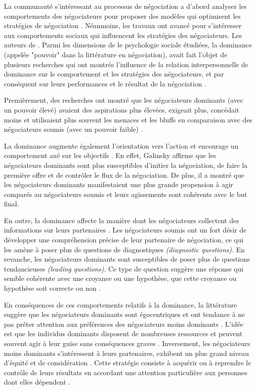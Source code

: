 	La communauté s'intéressant au processus de négociation a d'abord analyser les comportements des négociateurs pour proposer des modèles qui optimisent les stratégies de négociation \cite{thompson2010negotiation}.
	Néanmoins, les travaux ont avancé pour s'intéresser aux comportements sociaux qui influencent les stratégies des négociateurs. Les auteurs de \cite{thompson2010negotiation}. Parmi les dimensions de le psychologie sociale étudiées, la dominance  (appelée "pouvoir" dans la littérature en négociation), avait fait l'objet de plusieurs recherches qui ont montrés l'influence  de la relation interpersonnelle de dominance sur le comportement et les stratégies des négociateurs, et par conséquent sur leurs performances et le résultat de la négociation \cite{de1995impact,van2006power}.
	
	Premièrement, des recherches ont montré que les négociateurs dominants (avec un pouvoir élevé) avaient des aspirations plus élevées, exigeait plus, concédait moins et utilisaient plus souvent les menaces et les bluffs en comparaison avec des négociateurs soumis (avec un pouvoir faible) \cite{de1995impact}.
	
	
	 La dominance augmente également l'orientation vers l'action et encourage un comportement axé sur les objectifs \cite{van2006power}. En effet, Galinsky \cite{galinsky2003power} affirme que les négociateurs dominants sont plus susceptibles d'initier la négociation, de faire la première offre et de contrôler le flux de la négociation.  De plus, il a montré que les négociateurs dominants manifestaient une plus grande propension à agir comparés au négociateurs soumis et leurs agissements sont cohérents avec le but final.
	 
	 
	 En outre, la dominance affecte la manière dont les négociateurs collectent des informations sur leurs partenaires \cite{de2004influence}. Les négociateurs soumis ont un fort désir de développer une compréhension précise de leur partenaire de négociation, ce qui les amène à poser plus de questions  de diagnostiques \emph {(diagnostic questions)}.
	 En revanche, les négociateurs dominants sont susceptibles de poser plus de questions tendancieuses \emph {(leading questions)}. Ce type de question suggère une réponse  qui semble cohérente avec une croyance ou une hypothèse, que cette croyance ou hypothèse soit correcte ou non \cite{galinsky2003power}.
	
	En conséquences de ces comportements relatifs à la dominance, la littérature suggère que les négociateurs dominants sont égocentriques et ont tendance à ne pas prêter attention aux préférences des négociateurs moins dominants   \cite{fiske1993controlling, de1995impact}. L'idée est que les individus dominants disposent de nombreuses ressources et peuvent souvent agir à leur guise sans conséquences graves \cite{van2006power}. Inversement, les négociateurs moins dominants s'intéressent à leurs partenaires, exhibent un plus grand niveau d'équité et de considération \cite{de1995impact}. Cette stratégie consiste à acquérir ou à reprendre le contrôle de leurs résultats en accordant une attention particulière aux personnes dont elles dépendent \cite{fiske1993controlling}.
	
